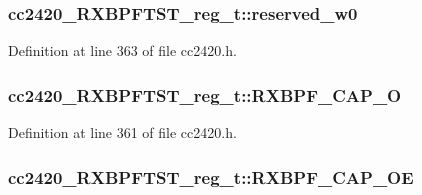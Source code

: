 \subsubsection[{\texorpdfstring{reserved\+\_\+w0}{reserved_w0}}]{ cc2420\+\_\+\+R\+X\+B\+P\+F\+T\+S\+T\+\_\+reg\+\_\+t\+::reserved\+\_\+w0}\hypertarget{structcc2420___r_x_b_p_f_t_s_t__reg__t_aef3f41e4ad2b7e0ec2af12b5d6ef24c7}{}\label{structcc2420___r_x_b_p_f_t_s_t__reg__t_aef3f41e4ad2b7e0ec2af12b5d6ef24c7}


Definition at line 363 of file cc2420.\+h.

\subsubsection[{\texorpdfstring{R\+X\+B\+P\+F\+\_\+\+C\+A\+P\+\_\+O}{RXBPF_CAP_O}}]{ cc2420\+\_\+\+R\+X\+B\+P\+F\+T\+S\+T\+\_\+reg\+\_\+t\+::\+R\+X\+B\+P\+F\+\_\+\+C\+A\+P\+\_\+O}\hypertarget{structcc2420___r_x_b_p_f_t_s_t__reg__t_acda73d4f7714897c33f9904f28ce8d16}{}\label{structcc2420___r_x_b_p_f_t_s_t__reg__t_acda73d4f7714897c33f9904f28ce8d16}


Definition at line 361 of file cc2420.\+h.

\subsubsection[{\texorpdfstring{R\+X\+B\+P\+F\+\_\+\+C\+A\+P\+\_\+\+OE}{RXBPF_CAP_OE}}]{ cc2420\+\_\+\+R\+X\+B\+P\+F\+T\+S\+T\+\_\+reg\+\_\+t\+::\+R\+X\+B\+P\+F\+\_\+\+C\+A\+P\+\_\+\+OE}\hypertarget{structcc2420___r_x_b_p_f_t_s_t__reg__t_a4f2ecfd232bf72e52e9301b459605ef4}{}\label{structcc2420___r_x_b_p_f_t_s_t__reg__t_a4f2ecfd232bf72e52e9301b459605ef4}


